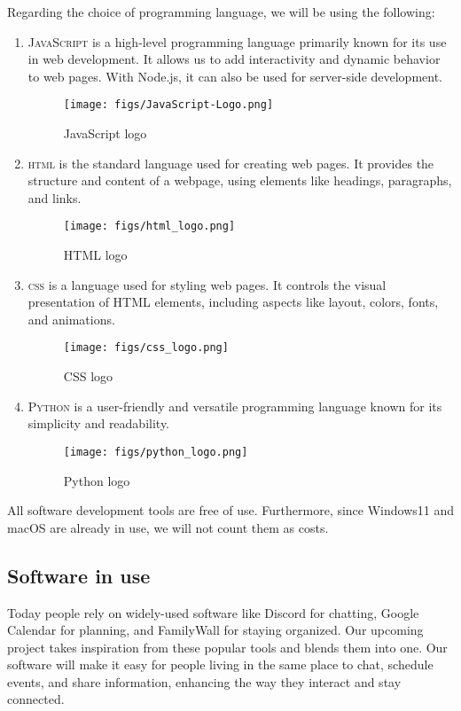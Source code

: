 \documentclass[conference]{IEEEtran}
\begin{document}
\vspace{12pt}
Regarding the choice of programming language, we will be using the following:
\begin{enumerate}
    \item \textsc{JavaScript} is a high-level programming language primarily known for its use in web development. It allows us to add interactivity and dynamic behavior to web pages. With Node.js, it can also be used for server-side development.
    \begin{figure}[H]
    \centering
    \texttt{[image: figs/JavaScript-Logo.png]}
    \caption{JavaScript logo}
    \label{fig:JavaScript logo}
    \end{figure}
    
    \item \textsc{html} is the standard language used for creating web pages. It provides the structure and content of a webpage, using elements like headings, paragraphs, and links.
    \begin{figure}[H]
    \centering
    \texttt{[image: figs/html\_logo.png]}
    \caption{HTML logo}
    \label{fig:HTML logo}
    \end{figure}
    
    \item \textsc{css} is a language used for styling web pages. It controls the visual presentation of HTML elements, including aspects like layout, colors, fonts, and animations.
    \begin{figure}[H]
    \centering
    \texttt{[image: figs/css\_logo.png]}
    \caption{CSS logo}
    \label{fig:CSS logo}
    \end{figure}
    
    \item \textsc{Python} is a user-friendly and versatile programming language known for its simplicity and readability.
    \begin{figure}[H]
    \centering
    \texttt{[image: figs/python\_logo.png]}
    \caption{Python logo}
    \label{fig:Python logo}
    \end{figure}
    
\end{enumerate}

All software development tools are free of use. Furthermore, since Windows11 and macOS are already in use, we will not count them as costs.

\subsection{Software in use}
Today people rely on widely-used software like Discord for chatting, Google Calendar for planning, and FamilyWall for staying organized. Our upcoming project takes inspiration from these popular tools and blends them into one. Our software will make it easy for people living in the same place to chat, schedule events, and share information, enhancing the way they interact and stay connected.
\end{document}
